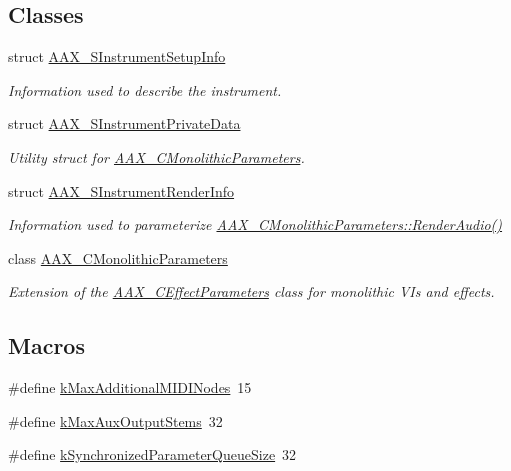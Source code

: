\subsection*{Classes}
\begin{DoxyCompactItemize}
\item 
struct \mbox{\hyperlink{a01957}{A\+A\+X\+\_\+\+S\+Instrument\+Setup\+Info}}
\begin{DoxyCompactList}\small\item\em Information used to describe the instrument. \end{DoxyCompactList}\item 
struct \mbox{\hyperlink{a01961}{A\+A\+X\+\_\+\+S\+Instrument\+Private\+Data}}
\begin{DoxyCompactList}\small\item\em Utility struct for \mbox{\hyperlink{a01969}{A\+A\+X\+\_\+\+C\+Monolithic\+Parameters}}. \end{DoxyCompactList}\item 
struct \mbox{\hyperlink{a01965}{A\+A\+X\+\_\+\+S\+Instrument\+Render\+Info}}
\begin{DoxyCompactList}\small\item\em Information used to parameterize \mbox{\hyperlink{a01969_a04f2f73d70ea28c17747c68fc3a20fc8}{A\+A\+X\+\_\+\+C\+Monolithic\+Parameters\+::\+Render\+Audio()}} \end{DoxyCompactList}\item 
class \mbox{\hyperlink{a01969}{A\+A\+X\+\_\+\+C\+Monolithic\+Parameters}}
\begin{DoxyCompactList}\small\item\em Extension of the \mbox{\hyperlink{a01481}{A\+A\+X\+\_\+\+C\+Effect\+Parameters}} class for monolithic V\+Is and effects. \end{DoxyCompactList}\end{DoxyCompactItemize}
\subsection*{Macros}
\begin{DoxyCompactItemize}
\item 
\#define \mbox{\hyperlink{a00746_af66ae5854aedf3b38c6d6540670966b1}{k\+Max\+Additional\+M\+I\+D\+I\+Nodes}}~15
\item 
\#define \mbox{\hyperlink{a00746_a3ce9db1fba97512379a8715f9cb166e4}{k\+Max\+Aux\+Output\+Stems}}~32
\item 
\#define \mbox{\hyperlink{a00746_a38d74fc5f1b026749c9b225353b4eb24}{k\+Synchronized\+Parameter\+Queue\+Size}}~32
\end{DoxyCompactItemize}


